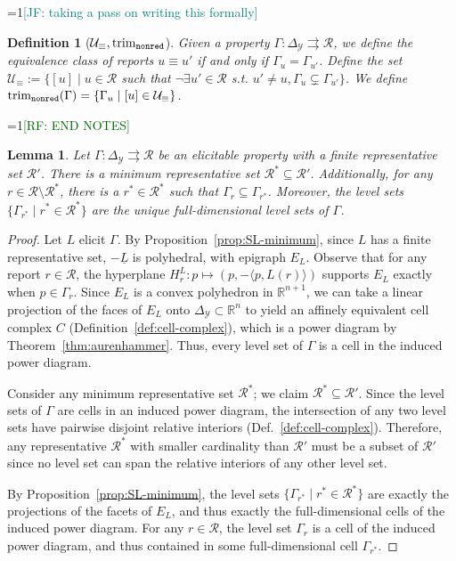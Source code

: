 \documentclass[11pt]{article}
\newcommand{\Comments}{1}
\newcommand{\mynote}[2]{\ifnum\Comments=1\textcolor{#1}{#2}\fi}
\newcommand{\raf}[1]{\mynote{darkgreen}{[RF: #1]}}
\newcommand{\jessie}[1]{\mynote{teal}{[JF: #1]}}
\newcommand{\reals}{\mathbb{R}}
\newcommand{\simplex}{\Delta_\Y}
\newcommand{\R}{\mathcal{R}}
\newcommand{\U}{\mathcal{U}}
\newcommand{\Y}{\mathcal{Y}}
\newcommand{\risk}[1]{\underline{#1}}
\newcommand{\inprod}[2]{\langle #1, #2 \rangle}%
\newcommand{\toto}{\rightrightarrows}
\newcommand{\trimnonred}{\mathrm{trim}_{{\tt nonred}}}
\newtheorem{lemma}{Lemma}
\newtheorem{definition}{Definition}
\begin{document}
\jessie{taking a pass on writing this formally}
\begin{definition}[$\U_\equiv, \trimnonred$]\label{def:trim-equiv}
	Given a property $\Gamma : \simplex \toto \R$, we define the equivalence class of reports $u \equiv u'$ if and only if $\Gamma_u = \Gamma_{u'}$.
	Define the set $\U_\equiv := \{[u] \mid u \in \R$ such that $\neg \exists u' \in \R$ s.t. $u' \neq u, \Gamma_u \subsetneq \Gamma_{u'}\}$.
	We define $\trimnonred(\Gamma) = \{\Gamma_u \mid [u] \in \U_\equiv\}$.
\end{definition}
\raf{END NOTES}

\begin{lemma}\label{lem:finite-minrep-weakly-dominate}
  Let $\Gamma : \simplex \toto \R$ be an elicitable property with a finite representative set $\R'$.
  There is a minimum representative set $\R^* \subseteq \R'$.
  Additionally, for any $r \in \R \setminus \R^*$, there is a $r^* \in \R^*$ such that $\Gamma_r \subseteq \Gamma_{r^*}$.
  Moreover, the level sets $\{\Gamma_{r^*} \mid r^* \in \R^*\}$ are the unique full-dimensional level sets of $\Gamma$.
\end{lemma}
\begin{proof}
  Let $L$ elicit $\Gamma$.
  By Proposition~\ref{prop:SL-minimum}, since $L$ has a finite representative set, $-\risk{L}$ is polyhedral, with epigraph $E_L$.
  Observe that for any report $r \in \R$, the hyperplane $H^L_r : p \mapsto (p, -\inprod{p}{L(r)})$ supports $E_L$ exactly when $p\in\Gamma_r$.
  Since $E_L$ is a convex polyhedron in $\reals^{n+1}$, we can take a linear projection of the faces of $E_L$ onto $\simplex \subset \reals^n$ to yield an affinely equivalent cell complex $C$ (Definition~\ref{def:cell-complex}), which is a power diagram by Theorem~\ref{thm:aurenhammer}.
  Thus, every level set of $\Gamma$ is a cell in the induced power diagram.
  
  Consider any minimum representative set $\R^*$; we claim $\R^* \subseteq \R'$.
  Since the level sets of $\Gamma$ are cells in an induced power diagram, the intersection of any two level sets have pairwise disjoint relative interiors (Def.~\ref{def:cell-complex}).
  Therefore, any representative $\R^*$ with smaller cardinality than $\R'$ must be a subset of $\R'$ since no level set can span the relative interiors of any other level set.

  By Proposition~\ref{prop:SL-minimum}, the level sets $\{\Gamma_{r^*} \mid r^*\in\R^*\}$ are exactly the projections of the facets of $E_L$, and thus exactly the full-dimensional cells of the induced power diagram.
  For any $r\in\R$, the level set $\Gamma_r$ is a cell of the induced power diagram, and thus contained in some full-dimensional cell $\Gamma_{r^*}$.
\end{proof}
\end{document}
